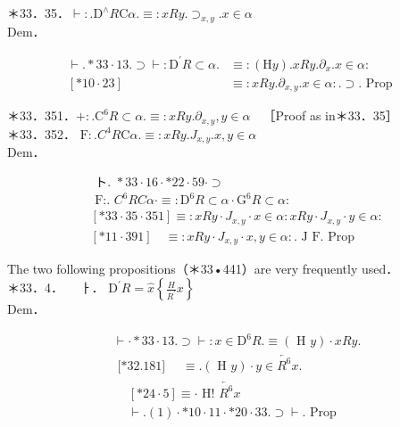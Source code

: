 \documentclass[10pt]{article}
\begin{document}
＊33．35．$\vdash: . \mathrm{D}^{\wedge} R \mathrm{C} \alpha . \equiv: x R y . \supset_{x, y} . x \in \alpha$\\
Dem．

$$
\begin{aligned}
\vdash . * 33 \cdot 13 . \supset \vdash: \mathrm{D}^{\prime} R \subset \alpha . & \equiv:(\mathrm{H} y) . x R y . \partial_{x} . x \in \alpha: \\
{[* 10 \cdot 23] } & \equiv: x R y . \partial_{x, y} . x \in \alpha: . \supset \text {. Prop }
\end{aligned}
$$

＊33．351．$+: . \mathrm{C}^{6} R \subset \alpha . \equiv: x R y . \partial_{x, y}, y \in \alpha \quad$［Proof as in＊33．35］\\
＊33．352． $\mathrm{F}: . C^{4} R \mathrm{C} \alpha . \equiv: x R y . J_{x, y} . x, y \in \alpha$\\
Dem．

$$
\begin{aligned}
& \text { ト. } * 33 \cdot 16 \cdot * 22 \cdot 59 \cdot \supset \\
& \text { F:. } C^{6} R C \alpha \cdot \equiv: \mathrm{D}^{6} R \subset \alpha \cdot \mathrm{G}^{6} R \subset \alpha: \\
& {[* 33 \cdot 35 \cdot 351] \equiv: x R y \cdot J_{x, y} \cdot x \in \alpha: x R y \cdot J_{x, y} \cdot y \in \alpha:} \\
& {[* 11 \cdot 391] \quad \equiv: x R y \cdot J_{x, y} \cdot x, y \in \alpha: . \text { J F. Prop }}
\end{aligned}
$$

The two following propositions（＊33•441）are very frequently used．\\
＊33．4．$\quad$ ㅏ． $\mathrm{D}^{\prime} R=\widehat{x}\left\{\frac{H}{R^{\prime}} x\right\}$\\
Dem．


\begin{align*}
& \vdash \cdot * 33 \cdot 13 . \supset \vdash: x \in \mathrm{D}^{6} R . \equiv(\text { H } y) \cdot x R y . \\
& \text { [*32.181] } \quad \equiv .(\text { H } y) \cdot y \in \overleftarrow{R^{6}} x . \\
& \begin{aligned}
& {[* 24 \cdot 5] } \equiv \cdot \text { H! } \overleftarrow{R^{6}} x \\
& \vdash .(1) \cdot * 10 \cdot 11 \cdot * 20 \cdot 33 . \supset \vdash . \text { Prop }
\end{aligned} \tag{1}
\end{align*}
\end{document}
